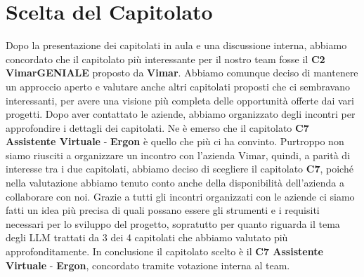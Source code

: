 \documentclass{article}
\begin{document}
\section{Scelta del Capitolato}

Dopo la presentazione dei capitolati in aula e una discussione interna, abbiamo concordato che 
il capitolato più interessante per il nostro team fosse il \textbf{C2 VimarGENIALE} proposto da \textbf{Vimar}.
Abbiamo comunque deciso di mantenere un approccio aperto e valutare anche altri capitolati proposti che
ci sembravano interessanti, per avere una visione più completa delle opportunità offerte dai vari progetti.
Dopo aver contattato le aziende, abbiamo organizzato degli incontri per approfondire i dettagli dei capitolati. 
Ne è emerso che il capitolato \textbf{C7 Assistente Virtuale} - \textbf{Ergon} è quello che più ci ha convinto.
Purtroppo non siamo riusciti a organizzare un incontro con l'azienda Vimar, quindi, a parità di interesse
tra i due capitolati, abbiamo deciso di scegliere il capitolato \textbf{C7}, poiché nella valutazione abbiamo 
tenuto conto anche della disponibilità dell'azienda a collaborare con noi.
Grazie a tutti gli incontri organizzati con le aziende ci siamo fatti un idea più precisa di quali possano
essere gli strumenti e i requisiti necessari per lo sviluppo del progetto, sopratutto per quanto riguarda
il tema degli LLM trattati da 3 dei 4 capitolati che abbiamo valutato più approfonditamente.
In conclusione il capitolato scelto è il \textbf{C7 Assistente Virtuale} - \textbf{Ergon}, 
concordato tramite votazione interna al team.
\end{document}
